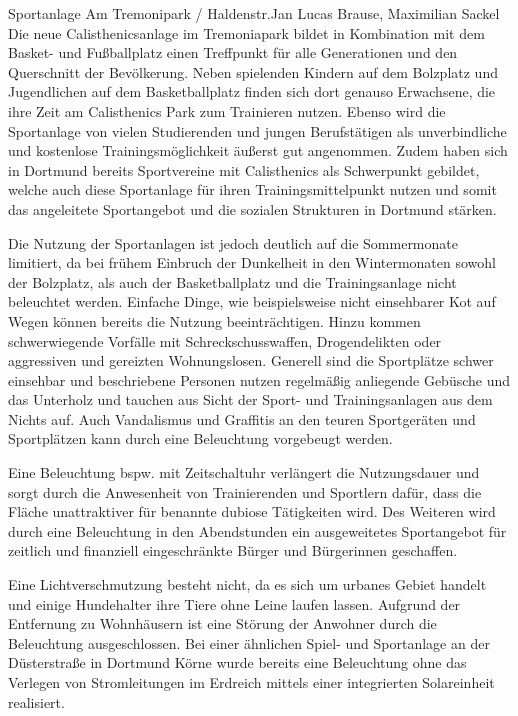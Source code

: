 \documentclass{../../templates/amendment}
\date{29. Dezember 2024}
\begin{document}
\begin{boxed}{Sportanlage Am Tremonipark / Haldenstr.}{Jan Lucas Brause, Maximilian Sackel}
    Die neue Calisthenicsanlage im Tremoniapark bildet in Kombination mit dem Basket- und Fußballplatz einen Treffpunkt für alle Generationen und den Querschnitt der Bevölkerung.
    Neben spielenden Kindern auf dem Bolzplatz und Jugendlichen auf dem Basketballplatz finden sich dort genauso Erwachsene, die ihre Zeit am Calisthenics Park zum Trainieren nutzen.
    Ebenso wird die Sportanlage von vielen Studierenden und jungen Berufstätigen als unverbindliche und kostenlose Trainingsmöglichkeit äußerst gut angenommen.
    Zudem haben sich in Dortmund bereits Sportvereine mit Calisthenics als Schwerpunkt gebildet, welche auch diese Sportanlage für ihren Trainingsmittelpunkt nutzen und somit das angeleitete Sportangebot und die sozialen Strukturen in Dortmund stärken.

    Die Nutzung der Sportanlagen ist jedoch deutlich auf die Sommermonate limitiert, da bei frühem Einbruch der Dunkelheit in den Wintermonaten sowohl der Bolzplatz, als auch der Basketballplatz und die Trainingsanlage nicht beleuchtet werden.
    Einfache Dinge, wie beispielsweise nicht einsehbarer Kot auf Wegen können bereits die Nutzung beeinträchtigen.
    Hinzu kommen schwerwiegende Vorfälle mit Schreckschusswaffen, Drogendelikten oder aggressiven und gereizten Wohnungslosen.
    Generell sind die Sportplätze schwer einsehbar und beschriebene Personen nutzen regelmäßig anliegende Gebüsche und das Unterholz und tauchen aus Sicht der Sport- und Trainingsanlagen aus dem Nichts auf.
    Auch Vandalismus und Graffitis an den teuren Sportgeräten und Sportplätzen kann durch eine Beleuchtung vorgebeugt werden.

    Eine Beleuchtung bspw. mit Zeitschaltuhr verlängert die Nutzungsdauer und sorgt durch die Anwesenheit von Trainierenden und Sportlern dafür, dass die Fläche unattraktiver für benannte dubiose Tätigkeiten wird.
    Des Weiteren wird durch eine Beleuchtung in den Abendstunden ein ausgeweitetes Sportangebot für zeitlich und finanziell eingeschränkte Bürger und Bürgerinnen geschaffen.

    Eine Lichtverschmutzung besteht nicht, da es sich um urbanes Gebiet handelt und einige Hundehalter ihre Tiere ohne Leine laufen lassen.
    Aufgrund der Entfernung zu Wohnhäusern ist eine Störung der Anwohner durch die Beleuchtung ausgeschlossen.
    Bei einer ähnlichen Spiel- und Sportanlage an der Düsterstraße in Dortmund Körne wurde bereits eine Beleuchtung ohne das Verlegen von Stromleitungen im Erdreich mittels einer integrierten Solareinheit realisiert.


\end{boxed}
\end{document}

